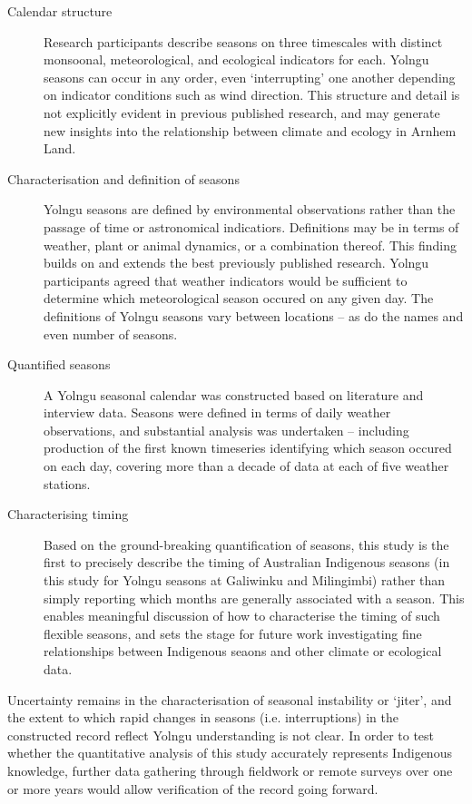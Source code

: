 \begin{description}
\item[Calendar structure]
    Research participants describe seasons on three timescales with distinct
    monsoonal, meteorological, and ecological indicators for each.
    Yolngu seasons can occur in any order, even `interrupting' one another
    depending on indicator conditions such as wind direction.  This structure
    and detail is not explicitly evident in previous published research, and
    may generate new insights into the relationship between climate and
    ecology in Arnhem Land.

\item[Characterisation and definition of seasons]
    Yolngu seasons are defined by environmental observations rather than the
    passage of time or astronomical indicatiors.  Definitions may be in terms
    of weather, plant or animal dynamics, or a combination thereof.
    This finding builds on and extends the best previously published research.
    Yolngu participants agreed that weather indicators would be sufficient to
    determine which meteorological season occured on any given day.  The definitions of
    Yolngu seasons vary between locations -- as do the names and even number
    of seasons.

\item[Quantified seasons]
    A Yolngu seasonal calendar was constructed based on literature
    and interview data.  Seasons were defined in terms of daily weather
    observations, and substantial analysis was undertaken -- including
    production of the first known timeseries identifying which season occured
    on each day, covering more than a decade of data at each of five weather
    stations.

\item[Characterising timing]
    Based on the ground-breaking quantification of seasons, this study is the
    first to precisely describe the timing of Australian Indigenous seasons
    (in this study for Yolngu seasons at Galiwinku and Milingimbi)
    rather than simply reporting which months
    are generally associated with a season.  This enables meaningful
    discussion of how to characterise the timing of such flexible seasons,
    and sets the stage for future work investigating fine relationships between
    Indigenous seaons and other climate or ecological data.
\end{description}

Uncertainty remains in the characterisation of seasonal instability or `jiter',
and the extent to which rapid changes in seasons (i.e. interruptions) in the
constructed record reflect Yolngu understanding is not clear.
In order to test whether the quantitative analysis of this study accurately
represents Indigenous knowledge, further data gathering through fieldwork or
remote surveys over one or more years would allow verification of the record
going forward.


